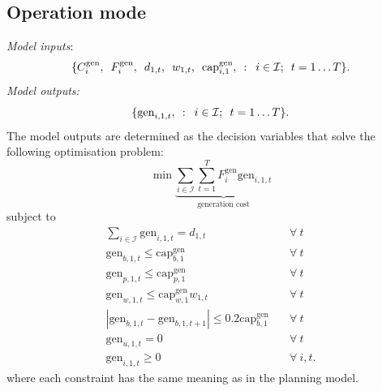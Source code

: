 \documentclass[preprint]{elsarticle}
\begin{document}
\subsection{Operation mode}
\label{sec:appendix:optimisation:model_2}
\noindent \textit{Model inputs}:
\begin{equation}
  \{C_{i}^\text{gen}, \hspace{0.5em} F_{i}^\text{gen}, \hspace{0.5em} d_{1, t}, \hspace{0.5em} w_{1, t}, \hspace{0.5em} \text{cap}_{i,1}^\text{gen}, \hspace{0.5em} : \hspace{0.5em} i \in \mathcal{I}; \hspace{0.5em} t = 1 \ldots T\}.
\label{eq:model_2:inputs}
\end{equation}
\textit{Model outputs:}
\begin{equation}
\{ \text{gen}_{i,1,t}, \hspace{0.5em} : \hspace{0.5em} i \in \mathcal{I}; \hspace{0.5em} t = 1 \ldots T\}.
\label{eq:model_2:decision_variables}
\end{equation}
The model outputs are determined as the decision variables that solve the following optimisation problem:
\begin{equation}
\min \underbrace{ \sum_{i \in \mathcal{I}} \sum_{t=1}^{T} F_i^\text{gen} \text{gen}_{i,1,t}}_\text{generation cost}
\label{eq:model_2:objective}
\end{equation}
\noindent subject to
\begin{align}
\sum_{i \in \mathcal{I}} \text{gen}_{i,1,t} = d_{1,t} \quad & \forall \: t \label{eq:model_2:demand_met} \\
\text{gen}_{b,1,t} \le \text{cap}_{b,1}^\text{gen} \quad & \forall \: t \label{eq:model_2:gen_le_cap_b} \\
\text{gen}_{p,1,t} \le \text{cap}_{p,1}^\text{gen} \quad & \forall \: t \label{eq:model_2:gen_le_cap_p} \\
\text{gen}_{w,1,t} \le \text{cap}_{w,1}^\text{gen} w_{1,t} \quad & \forall \: t \label{eq:model_2:gen_le_cap_w} \\
|\text{gen}_{b,1,t} - \text{gen}_{b,1,t+1}| \le 0.2 \text{cap}_{b,1}^\text{gen} \quad & \forall \: t \label{eq:model_2:ramping} \\
\text{gen}_{u,1,t} = 0 \quad & \forall \: t \label{eq:model_2:no_unmet} \\
\text{gen}_{i,1,t} \ge 0 \quad & \forall \: i, t. \label{eq:model_2:ge_0}
\end{align}
\noindent where each constraint has the same meaning as in the planning model.
\end{document}
